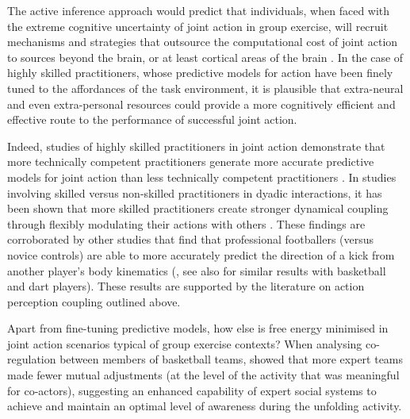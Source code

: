 \begin{CJK}{UTF8}{gbsn}
The active inference approach would predict that individuals, when faced with the extreme cognitive uncertainty of joint action in group exercise, will recruit mechanisms and strategies that outsource the computational cost of joint action to sources beyond the brain, or at least cortical areas of the brain \citep{Dietrich2004,Clark2015}.  In the case of highly skilled practitioners, whose predictive models for action have been finely tuned to the affordances of the task environment, it is plausible that extra-neural and even extra-personal resources could provide a more cognitively efficient and effective route to the performance of successful joint action.

Indeed, studies of highly skilled practitioners in joint action demonstrate that more technically competent practitioners generate more accurate predictive models for joint action than less technically competent practitioners \citep{Tomeo2012,Aglioti2008,Mulligan2016}.   In studies involving skilled versus non-skilled practitioners in dyadic interactions, it has been shown that more skilled practitioners create stronger dynamical coupling through flexibly modulating their actions with others \citep{Schmidt2011,Caron2017}. These findings are corroborated by other studies that find that professional footballers (versus novice controls) are able to more accurately predict the direction of a kick from another player's body kinematics (\cite{Tomeo2012}, see also \cite{Aglioti2008,Mulligan2016} for similar results with basketball and dart players).  These results are supported by the literature on action perception coupling outlined above.

Apart from fine-tuning predictive models, how else is free energy minimised in joint action scenarios typical of group exercise contexts?  When analysing co-regulation between members of basketball teams,  \textcite{Bourbousson2015}  showed that more expert teams made fewer mutual adjustments (at the level of the activity that was meaningful for co-actors), suggesting an enhanced capability of expert social systems to achieve and maintain an optimal level of awareness during the unfolding activity.


\end{CJK}
